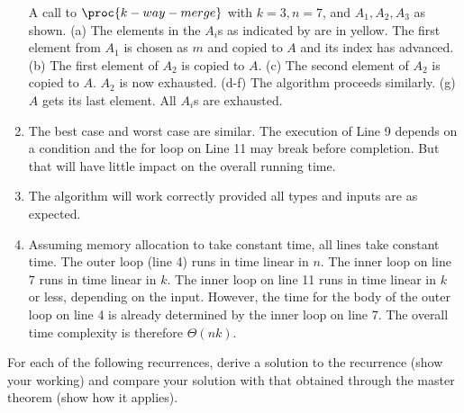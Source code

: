 \documentclass[a4paper]{exam}
\begin{document}
\begin{questions}
\begin{parts}
\begin{solution}
\begin{enumerate}
      A call to $\proc{k-way-merge}$ with $k=3, n=7$, and $A_1,A_2,A_3$ as shown. (a) The elements in the $A_i$s as indicated by  are in yellow. The first element from $A_1$ is chosen as $m$ and copied to $A$ and its index has advanced. (b) The first element of $A_2$ is copied to $A$. (c) The second element of $A_2$ is copied to $A$. $A_2$ is now exhausted. (d-f) The algorithm proceeds similarly. (g) $A$ gets its last element. All $A_i$s are exhausted.

    \item The best case and worst case are similar. The execution of Line 9 depends on a condition and the for loop on Line 11 may break before completion. But that will have little impact on the overall running time.
    \item The algorithm will work correctly provided all types and inputs are as expected.
    \item Assuming memory allocation to take constant time, all lines take constant time. The outer \For loop (line 4) runs in time linear in $n$. The inner \For loop on line 7 runs in time linear in $k$. The inner \For loop on line 11 runs in time linear in $k$ or less, depending on the input. However, the time for the body of the outer \For loop on line 4 is already determined by the inner \For loop on line 7. The overall time complexity is therefore $\Theta(nk)$.
    \end{enumerate}
    \end{solution}
  \end{parts}
  
\question For each of the following recurrences, derive a solution to the recurrence (show your working) and compare your solution with that obtained through the master theorem (show how it applies). 
\end{questions}
\end{document}
